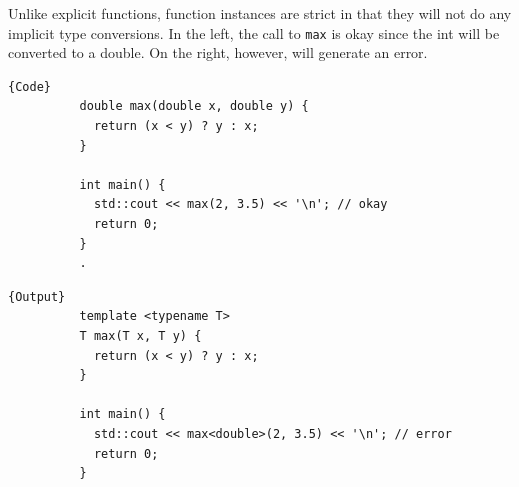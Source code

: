 \documentclass{article}
\newcounter{definition}[section]
\begin{document}
    \begin{lemma}
      \label{thm:no-implicit-type-conversions}
      Unlike explicit functions, function instances are strict in that they will not do any implicit type conversions. In the left, the call to \texttt{max} is okay since the int will be converted to a double. On the right, however, will generate an error. 

      \noindent\begin{minipage}{.5\textwidth}
        \begin{lstlisting}[]{Code}
          double max(double x, double y) {
            return (x < y) ? y : x;
          }

          int main() {
            std::cout << max(2, 3.5) << '\n'; // okay
            return 0;
          }
          .
        \end{lstlisting}
        \end{minipage}
        \hfill
        \begin{minipage}{.49\textwidth}
        \begin{lstlisting}[]{Output}
          template <typename T>
          T max(T x, T y) {
            return (x < y) ? y : x;
          }

          int main() {
            std::cout << max<double>(2, 3.5) << '\n'; // error
            return 0;
          }
        \end{lstlisting}
      \end{minipage}
    \end{lemma} 

    \begin{definition}
      \label{def:multiple-template-type-parameters}
      
    \end{definition}

    \begin{definition}
      \label{def:overloading-function-templates}
      
    \end{definition}
\end{document}
